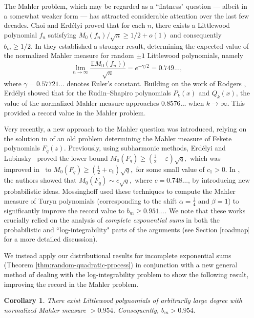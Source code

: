 \documentclass[12pt, a4paper]{amsart}
\newtheorem{corollary}{Corollary}
\theoremstyle{remark}
\begin{document}
The Mahler problem, which may be regarded as a ``flatness" question ---
albeit in a somewhat weaker form --- has attracted considerable attention over
the last few decades. Choi and Erd\'{e}lyi \cite{CE} proved that for each $n$,
there exists a Littlewood polynomial $f_n$ satisfying $M_0(f_n)/\sqrt{n}\ge
1/2+o(1)$ and consequently $b_m\ge 1/2.$ In \cite{CE1} they established a
stronger result, determining the expected value of the normalized Mahler
measure for random $\pm 1$  Littlewood polynomials, namely
\[
\lim_{n\to\infty}\frac{\mathbb{E}M_0(f_n))}{\sqrt{n}}=e^{-\gamma/2} = 0.749\ldots,
\]
where $\gamma = 0.57721...$ denotes Euler’s constant. Building on the work of Rodgers \cite{Rod}, Erd\'{e}lyi \cite{Rudin-Shapiro} showed
that for the Rudin–Shapiro polynomials $P_k(x)$ and $Q_k(x)$, the value of the
normalized Mahler measure approaches 
$0.8576\dots$ when $k\to\infty.$
This provided a record value in the Mahler problem.

Very recently, a new approach to the Mahler question was introduced, relying on
the solution in \cite{KLM-fekete} of an old problem determining the Mahler measure
of Fekete polynomials $F_q(z).$ Previously, using subharmonic methods, Erd\'elyi and
Lubinsky~\cite{LE} proved the lower bound $M_0(F_q)\ge
(\frac{1}{2}-\varepsilon)\sqrt{q},$ which was improved in~\cite{Lower-Mah}
to $M_0(F_q)\ge (\frac{1}{2}+c_1)\sqrt{q},$ for some small value of $c_1>0.$ In
\cite{KLM-fekete}, the authors showed that $M_0(F_q)\sim c\sqrt{q},$ where
$c=0.748\dots$, by introducing new probabilistic ideas.
Mossinghoff \cite{mossinghoff-mahler} used these techniques to compute the Mahler measure of Turyn
polynomials (corresponding to the shift $\alpha=\frac{1}{4} $ and $\beta=1$)
to significantly improve the record value to $b_m\ge 0.951\dots.$ We note that
these works crucially relied on the analysis of {\it complete exponential
sums} in both the probabilistic and ``log-integrability" parts of the arguments
(see Section \ref{roadmap} for a more detailed discussion).  

We instead apply our distributional results for incomplete exponential sums
(Theorem \ref{thm:random-quadratic-process}) in conjunction with a new
general method of dealing with the log-integrability problem to show the
following result, improving the record in the Mahler problem.
\begin{corollary}\label{mahler-quant}
    There exist Littlewood polynomials of arbitrarily large degree
    with normalized Mahler measure $> 0.954$. Consequently, $b_m>0.954$.
\end{corollary}
\end{document}
